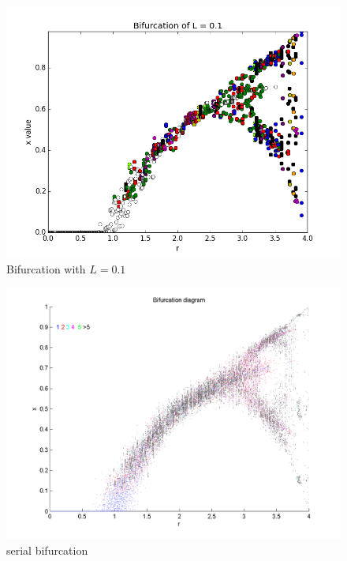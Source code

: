 \documentclass[12pt]{article}
\begin{document}
\begin{figure}[H]
	\begin{center}
		\includegraphics[scale=0.5]{Bifurcation_L1}
\caption{Bifurcation with $L=0.1$}
	\end{center}
\end{figure}
\begin{figure}[H]
	\begin{center}
		\includegraphics[scale=0.5]{bif}
\caption{serial bifurcation}
	\end{center}
\end{figure}
\end{document}

